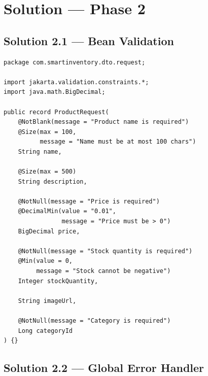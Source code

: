 \documentclass[12pt,a4paper]{report}
\begin{document}
\chapter{Solution --- Phase 2}

\section{Solution 2.1 --- Bean Validation}

\begin{lstlisting}[style=javastyle, title={dto/request/ProductRequest.java (updated)}]
package com.smartinventory.dto.request;

import jakarta.validation.constraints.*;
import java.math.BigDecimal;

public record ProductRequest(
    @NotBlank(message = "Product name is required")
    @Size(max = 100,
          message = "Name must be at most 100 chars")
    String name,

    @Size(max = 500)
    String description,

    @NotNull(message = "Price is required")
    @DecimalMin(value = "0.01",
                message = "Price must be > 0")
    BigDecimal price,

    @NotNull(message = "Stock quantity is required")
    @Min(value = 0,
         message = "Stock cannot be negative")
    Integer stockQuantity,

    String imageUrl,

    @NotNull(message = "Category is required")
    Long categoryId
) {}
\end{lstlisting}

\section{Solution 2.2 --- Global Error Handler}
\end{document}
